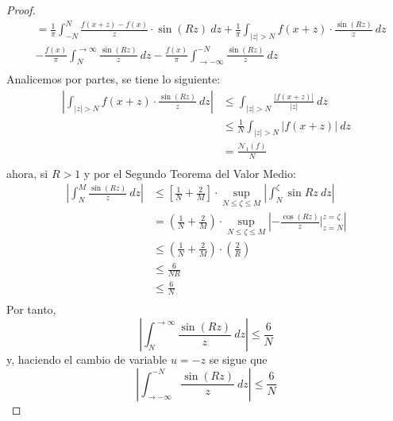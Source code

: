 \documentclass[12pt]{report}
\newcounter{it}
\theoremstyle{largebreak}
\renewcommand{\leq}{\ensuremath{\leqslant}}
\newcommand\abs[1]{\ensuremath{\left|#1\right|}}
\newcommand{\N}[2]{\ensuremath{\mathcal{N}_{#1}\left(#2\right)}}
\begin{document}
\begin{proof}
\begin{equation*}
\begin{split}
                &=\frac{1}{\pi}\int_{-N}^{N}\frac{f(x+z)-f(x)}{z}\cdot\sin(Rz)\:dz+\frac{1}{\pi}\int_{\abs{z}>N}f(x+z)\cdot\frac{\sin(Rz)}{z}\:dz\\
                &-\frac{f(x)}{\pi}\int_{N}^{\rightarrow\infty}\frac{\sin (Rz)}{z}\:dz-\frac{f(x)}{\pi}\int_{\rightarrow-\infty}^{-N}\frac{\sin (Rz)}{z}\:dz\\
            \end{split}
        \end{equation*}
        Analicemos por partes, se tiene lo siguiente:
        \begin{equation*}
            \begin{split}
                \abs{\int_{\abs{z}>N}f(x+z)\cdot\frac{\sin(Rz)}{z}\:dz}&\leq\int_{\abs{z}>N}\frac{\abs{f(x+z)}}{\abs{z}}\:dz\\
                &\leq\frac{1}{N}\int_{\abs{z}>N}\abs{f(x+z)}\:dz\\
                &=\frac{\N{1}{f}}{N}\\
            \end{split}
        \end{equation*}
        ahora, si $R>1$ y por el Segundo Teorema del Valor Medio:
        \begin{equation*}
            \begin{split}
                \abs{\int_{N}^{M}\frac{\sin (Rz)}{z}\:dz}&\leq\left[\frac{1}{N}+\frac{2}{M} \right]\cdot\sup_{N\leq\zeta\leq M}\abs{\int_{N}^{\zeta}\sin Rz\:dz}\\
                &=\left(\frac{1}{N}+\frac{2}M{}\right)\cdot\sup_{N\leq\zeta\leq M}\abs{-\frac{\cos(Rz)}{z}\Big|_{z=N}^{ z=\zeta}}\\
                &\leq\left(\frac{1}{N}+\frac{2}{M}\right)\cdot\left(\frac{2}{R}\right)\\
                &\leq\frac{6}{NR}\\
                &\leq\frac{6}{N}\\
            \end{split}
        \end{equation*}
        Por tanto,
        \begin{equation*}
            \abs{\int_{N}^{\rightarrow\infty}\frac{\sin (Rz)}{z}\:dz}\leq\frac{6}{N}
        \end{equation*}
        y, haciendo el cambio de variable $u=-z$ se sigue que
        \begin{equation*}
            \abs{\int_{\rightarrow-\infty}^{-N}\frac{\sin (Rz)}{z}\:dz}\leq\frac{6}{N}

\end{equation*}
\end{proof}
\end{document}
